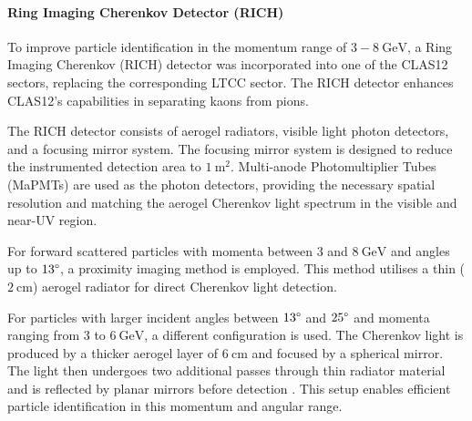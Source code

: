 \paragraph{Ring Imaging Cherenkov Detector (RICH)}
    To improve particle identification in the momentum range of $3 - 8 ~\text{GeV}$, a Ring Imaging Cherenkov (RICH) detector was incorporated into one of the CLAS12 sectors, replacing the corresponding LTCC sector.
    The RICH detector enhances CLAS12's capabilities in separating kaons from pions.

    The RICH detector consists of aerogel radiators, visible light photon detectors, and a focusing mirror system.
    The focusing mirror system is designed to reduce the instrumented detection area to $1 ~\text{m}^2$.
    Multi-anode Photomultiplier Tubes (MaPMTs) are used as the photon detectors, providing the necessary spatial resolution and matching the aerogel Cherenkov light spectrum in the visible and near-UV region.

    For forward scattered particles with momenta between $3$ and $8 ~\text{GeV}$ and angles up to $13\degree$, a proximity imaging method is employed.
    This method utilises a thin ($2 ~\text{cm}$) aerogel radiator for direct Cherenkov light detection.

    For particles with larger incident angles between $13\degree$ and $25\degree$ and momenta ranging from $3$ to $6 ~\text{GeV}$, a different configuration is used.
    The Cherenkov light is produced by a thicker aerogel layer of $6 ~\text{cm}$ and focused by a spherical mirror.
    The light then undergoes two additional passes through thin radiator material and is reflected by planar mirrors before detection \cite{contalbrigo2020}.
    This setup enables efficient particle identification in this momentum and angular range.
